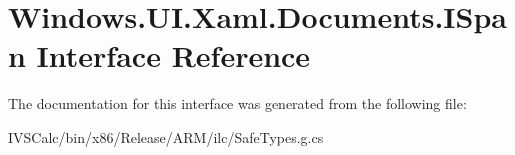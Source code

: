 \hypertarget{interface_windows_1_1_u_i_1_1_xaml_1_1_documents_1_1_i_span}{}\section{Windows.\+U\+I.\+Xaml.\+Documents.\+I\+Span Interface Reference}
\label{interface_windows_1_1_u_i_1_1_xaml_1_1_documents_1_1_i_span}


The documentation for this interface was generated from the following file\+:\begin{DoxyCompactItemize}
\item 
I\+V\+S\+Calc/bin/x86/\+Release/\+A\+R\+M/ilc/Safe\+Types.\+g.\+cs\end{DoxyCompactItemize}

